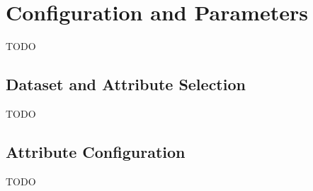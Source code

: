 % 
\chapter{Configuration and Parameters}
\label{app:parameters}

TODO

\section{Dataset and Attribute Selection}

TODO

\section{Attribute Configuration}

TODO